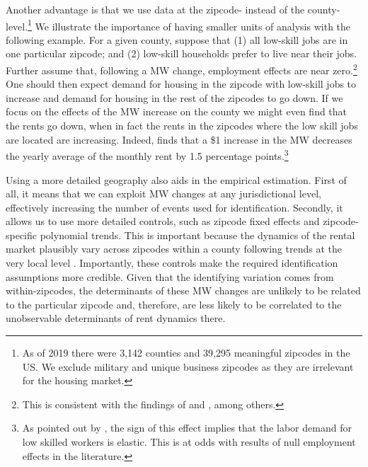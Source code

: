 Another advantage is that we use data at the zipcode- instead of the county-level.\footnote{
	As of 2019 there were 3,142 counties and 39,295 meaningful zipcodes in the US. We exclude 
	military and unique business zipcodes as they are irrelevant for the housing market.} 
We illustrate the importance of having smaller units of analysis with the following example. 
For a given county, suppose that (1) all low-skill jobs are in one particular zipcode; and 
(2) low-skill households prefer to live near their jobs. Further assume that, following a MW 
change, employment effects are near zero.\footnote{This is consistent with the findings of 
	\textcite{CardKrueger2000} and \textcite{CegnizEtAl2019}, among others.} 
One should then expect demand for housing in the zipcode with low-skill jobs to increase and 
demand for housing in the rest of the zipcodes to go down. If we focus on the effects of the 
MW increase on the county we might even find that the rents go down, when in fact the rents in 
the zipcodes where the low skill jobs are located are increasing. Indeed, \textcite{Tidemann2018} 
finds that a \$1 increase in the MW decreases the yearly average of the monthly rent by 1.5 
percentage points.\footnote{As pointed out by \textcite{Tidemann2018}, the sign of this 
	effect 	implies that the labor demand for low skilled workers is elastic. This is at 
	odds with results of null employment effects in the literature.} 

Using a more detailed geography also aids in the empirical estimation. First of all, it means 
that we can exploit MW changes at any jurisdictional level, effectively increasing the number 
of events used for identification. Secondly, it allows us to use more detailed controls, such 
as zipcode fixed effects and zipcode-specific polynomial trends. This is important 
because the dynamics of the rental market plausibly vary across zipcodes within a county 
following trends at the very local level \parencite{AlmagroDominguez2019}. Importantly, these 
controls make the required identification assumptions more credible. Given that the identifying 
variation comes from within-zipcodes, the determinants of these MW changes are unlikely to be 
related to the particular zipcode and, therefore, are less likely to be correlated to the 
unobservable determinants of rent dynamics there.


